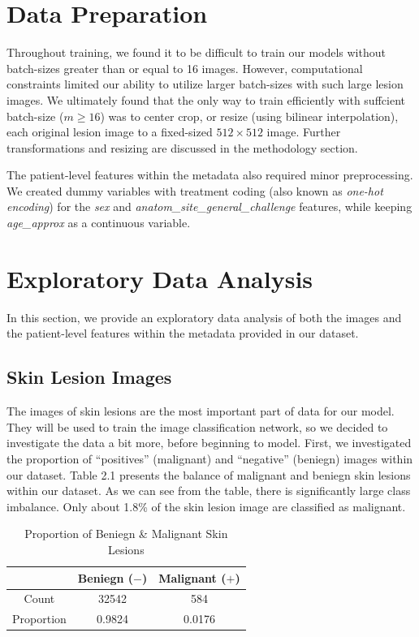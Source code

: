 \documentclass [MAS] {uclathes}
\begin{document}
\section{Data Preparation}

Throughout training, we found it to be difficult to train our models without batch-sizes greater than or equal to 16 images. However, computational constraints limited our ability to utilize larger batch-sizes with such large lesion images. We ultimately found that the only way to train efficiently with suffcient batch-size ($m \geq 16$) was to center crop, or resize (using bilinear interpolation), each original lesion image to a fixed-sized $512 \times 512$ image. Further transformations and resizing are discussed in the methodology section.

The patient-level features within the metadata also required minor preprocessing. We created dummy variables with treatment coding (also known as \textit{one-hot encoding}) for the \textit{sex} and \textit{anatom\_site\_general\_challenge} features, while keeping \textit{age\_approx} as a continuous variable.


\section{Exploratory Data Analysis}

In this section, we provide an exploratory data analysis of both the images and the patient-level features within the metadata provided in our dataset.

\subsection{Skin Lesion Images}

The images of skin lesions are the most important part of data for our model. They will be used to train the image classification network, so we decided to investigate the data a bit more, before beginning to model. First, we investigated the proportion of ``positives'' (malignant) and ``negative'' (beniegn) images within our dataset. Table 2.1 presents the balance of malignant and beniegn skin lesions within our dataset. As we can see from the table, there is significantly large class imbalance. Only about 1.8\% of the skin lesion image are classified as malignant. 

\begin{table}[h!]
\centering
\begin{tabular}{| c | c | c |} 
\hline
& Beniegn ($-$) & Malignant ($+$) \\ 
\hline
\hline
Count & 32542 & 584\\
\hline
Proportion & 0.9824 & 0.0176\\
\hline  
\end{tabular}
\label{tab:propMel}
\caption{Proportion of Beniegn \& Malignant Skin Lesions}
\end{table}
\end{document}

